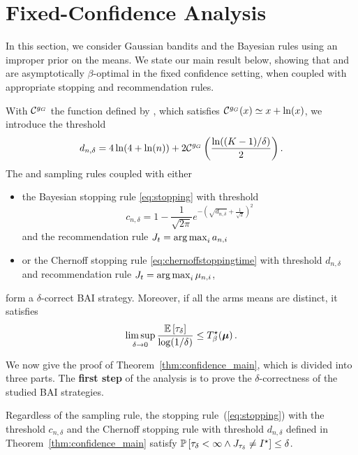 \section{Fixed-Confidence Analysis}\label{sec:t3c.confidence}

In this section, we consider Gaussian bandits and the Bayesian rules using an improper prior on the means.
We state our main result below, showing that \TTTS and \TCC are asymptotically $\beta$-optimal in the fixed confidence setting, when coupled with appropriate stopping and recommendation rules. 

\begin{theorem}\label{thm:confidence_main} 
\begin{leftbar}[theorembar]
With $\mathcal{C}^{g_G}$ the function defined by \cite{kaufmann2018mixture}, which satisfies $\mathcal{C}^{g_G}(x) \simeq x+\ln(x)$, we introduce the threshold
\begin{equation}d_{n,\delta} = 4\ln(4+\ln(n)) + 2 \mathcal{C}^{g_G}\left(\frac{\ln((K-1)/\delta)}{2}\right).\label{def:thresholdD}\end{equation}
The \TTTS and \TCC sampling rules coupled with either   
\begin{itemize}
 \item the Bayesian stopping rule \eqref{eq:stopping} with threshold \[c_{n,\delta} = 1 - \frac{1}{\sqrt{2\pi}} e^{-\left(\sqrt{d_{n,\delta}} + \frac{1}{\sqrt{2}}\right)^2}\]
 and the recommendation rule $J_t = \operatorname*{arg\,max}_{i} a_{n,i}$
  \item or the Chernoff stopping rule \eqref{eq:chernoffstoppingtime} with threshold $d_{n,\delta}$
 and recommendation rule $J_t = \operatorname*{arg\,max}_i \mu_{n,i}$,
\end{itemize}
form a $\delta$-correct BAI strategy. Moreover, if all the arms means are distinct, it satisfies  
    \[
        \limsup_{\delta\rightarrow{0}} \frac{\mathbb{E}\left[\tau_{\delta}\right]}{\log(1/\delta)} \leq T_{\beta}^\star({\boldsymbol \mu})\,.
    \]
\end{leftbar}
\end{theorem}

We now give the proof of Theorem~\ref{thm:confidence_main}, which is divided into three parts. The \textbf{first step} of the analysis is to prove the $\delta$-correctness of the studied BAI strategies.

\begin{theorem}\label{thm:t3c.pac}
\begin{leftbar}[theorembar]
    Regardless of the sampling rule, the stopping rule~(\ref{eq:stopping}) with the threshold $c_{n,\delta}$ and the Chernoff stopping rule with threshold $d_{n,\delta}$ defined in Theorem~\ref{thm:confidence_main} satisfy $        \mathbb{P}\left[\tau_{\delta} < \infty \wedge J_{\tau_{\delta}} \neq I^\star\right] \leq \delta$.
\end{leftbar}
\end{theorem}

